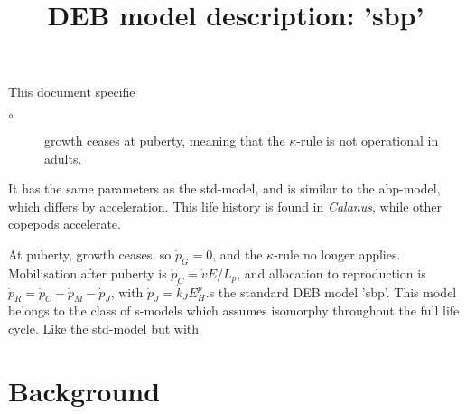\documentclass{article}
\title{DEB model description: 'sbp'}
\begin{document}
\maketitle

This document specifie\begin{description}
  \item[$\circ$] growth ceases at puberty, meaning that the $\kappa$-rule is not operational in adults.   
\end{description}
It has the same parameters as the std-model, and is similar to the abp-model, which differs by acceleration.
This life history is found in \emph{Calanus}, while other copepods accelerate. 

At puberty, growth ceases. so $\dot{p}_G = 0$, and the $\kappa$-rule no longer applies. 
Mobilisation after puberty is $\dot{p}_C = \dot{v} E/ L_p$, 
  and allocation to reproduction is $\dot{p}_R = \dot{p}_C - \dot{p}_M - \dot{p}_J$, with $\dot{p}_J = \dot{k}_J E_H^p$.s the standard DEB model 'sbp'.
This model belongs to the class of s-models which assumes isomorphy throughout the full life cycle.
Like the std-model but with 

\section{Background}







\end{document}
